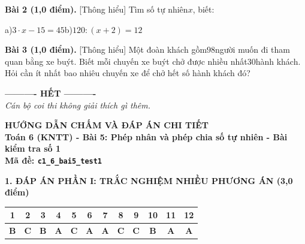 \documentclass[11pt,a4paper]{article}
\begin{document}
\noindent\textbf{Bài 2 (1,0 điểm).} [Thông hiểu] Tìm số tự nhiên$x$, biết:\par\noindent a)$3 \cdot x - 15 = 45$b)$120 : (x + 2) = 12$\par\vspace{8pt}

\noindent\textbf{Bài 3 (1,0 điểm).} [Thông hiểu] Một đoàn khách gồm$98$người muốn đi tham quan bằng xe buýt. Biết mỗi chuyến xe buýt chở được nhiều nhất$30$hành khách. Hỏi cần ít nhất bao nhiêu chuyến xe để chở hết số hành khách đó?\par\vspace{8pt}


\begin{center}
\textbf{---------- HẾT ----------}\\
\textit{\small Cán bộ coi thi không giải thích gì thêm.}
\end{center}

\newpage
\begin{center}
{\Large\bfseries HƯỚNG DẪN CHẤM VÀ ĐÁP ÁN CHI TIẾT}\\[4pt]
{\large\bfseries Toán 6 (KNTT) - Bài 5: Phép nhân và phép chia số tự nhiên - Bài kiểm tra số 1}\\[2pt]
{\bfseries Mã đề: \texttt{c1\_6\_bai5\_test1}}
\end{center}

\vspace{10pt}
\noindent\textbf{\large 1. ĐÁP ÁN PHẦN I: TRẮC NGHIỆM NHIỀU PHƯƠNG ÁN (3,0 điểm)}
\vspace{4pt}
\begin{center}
\begin{tabular}{|c|c|c|c|c|c|c|c|c|c|c|c|}
\hline
\textbf{1} & \textbf{2} & \textbf{3} & \textbf{4} & \textbf{5} & \textbf{6} & \textbf{7} & \textbf{8} & \textbf{9} & \textbf{10} & \textbf{11} & \textbf{12} \\
\hline
\textbf{B} & \textbf{C} & \textbf{B} & \textbf{A} & \textbf{C} & \textbf{A} & \textbf{A} & \textbf{C} & \textbf{C} & \textbf{B} & \textbf{A} & \textbf{A} \\
\hline
\end{tabular}
\end{center}
\vspace{6pt}
\end{document}
